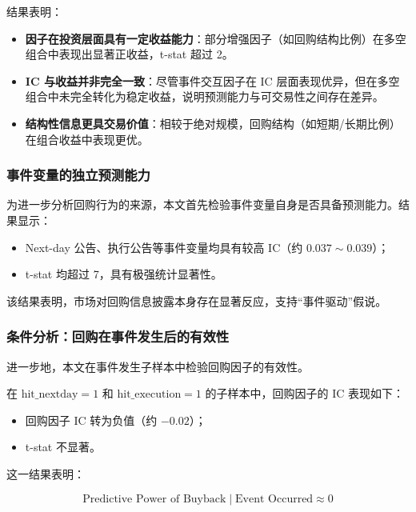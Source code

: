 \documentclass[a4paper,10pt]{article}
\begin{document}
结果表明：

\begin{itemize}
    \item \textbf{因子在投资层面具有一定收益能力}：部分增强因子（如回购结构比例）在多空组合中表现出显著正收益，t-stat 超过 2。
    
    \item \textbf{IC 与收益并非完全一致}：尽管事件交互因子在 IC 层面表现优异，但在多空组合中未完全转化为稳定收益，说明预测能力与可交易性之间存在差异。
    
    \item \textbf{结构性信息更具交易价值}：相较于绝对规模，回购结构（如短期/长期比例）在组合收益中表现更优。
\end{itemize}

\subsubsection{事件变量的独立预测能力}

为进一步分析回购行为的来源，本文首先检验事件变量自身是否具备预测能力。结果显示：

\begin{itemize}
    \item Next-day 公告、执行公告等事件变量均具有较高 IC（约 $0.037 \sim 0.039$）；
    \item t-stat 均超过 7，具有极强统计显著性。
\end{itemize}

该结果表明，市场对回购信息披露本身存在显著反应，支持“事件驱动”假说。

\subsubsection{条件分析：回购在事件发生后的有效性}

进一步地，本文在事件发生子样本中检验回购因子的有效性。

在 $\text{hit\_nextday}=1$ 和 $\text{hit\_execution}=1$ 的子样本中，回购因子的 IC 表现如下：
\begin{itemize}
    \item 回购因子 IC 转为负值（约 $-0.02$）；
    \item t-stat 不显著。
\end{itemize}

这一结果表明：

\begin{equation}
\text{Predictive Power of Buyback} \mid \text{Event Occurred} \approx 0
\end{equation}
\end{document}
